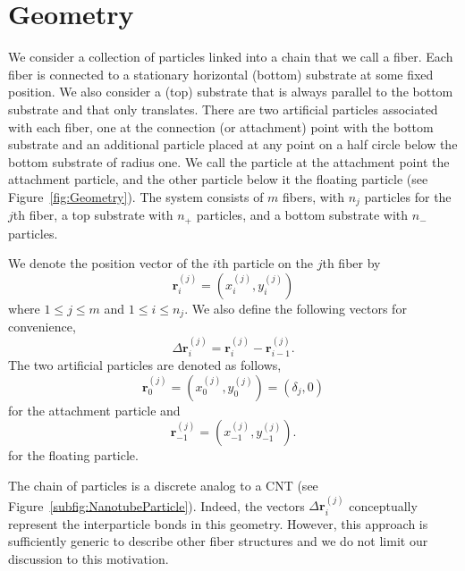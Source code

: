 \section{Geometry}

   We consider a collection of particles linked into a chain that we call a fiber. Each fiber is connected to a stationary horizontal (bottom) substrate at some fixed position. We also consider a (top) substrate that is always parallel to the bottom substrate and that only translates. There are two artificial particles associated with each fiber, one at the connection (or attachment) point with the bottom substrate and an additional particle placed at any point on a half circle below the bottom substrate of radius one. We call the particle at the attachment point the attachment particle, and the other particle below it the floating particle (see Figure~\ref{fig:Geometry}). The system consists of $m$ fibers, with $n_j$ particles for the $j$th fiber, a top substrate with $n_+$ particles, and a bottom substrate with $n_-$ particles.
	
We denote the position vector of the $i$th particle on the $j$th fiber by
\begin{equation}
	\textbf{r}_i^{(j)} = (x_i^{(j)},y_i^{(j)})
\end{equation}
where $1 \leq j \leq m$ and $1 \leq i \leq n_j$. We also define the following vectors for convenience,
\begin{equation}
	\Delta \textbf{r}_i^{(j)} = \textbf{r}_i^{(j)} - \textbf{r}_{i-1}^{(j)}.
\end{equation}
The two artificial particles are denoted as follows,
\begin{equation}
	\textbf{r}_0^{(j)} = (x_0^{(j)},y_0^{(j)}) = (\delta_j,0)
\end{equation}
for the attachment particle and
\begin{equation}
	\textbf{r}_{-1}^{(j)} = (x_{-1}^{(j)},y_{-1}^{(j)}).
\end{equation}
for the floating particle.

	The chain of particles is a discrete analog to a CNT (see Figure~\ref{subfig:NanotubeParticle}). Indeed, the vectors $\Delta \textbf{r}_i^{(j)}$ conceptually represent the interparticle bonds in this geometry. However, this approach is sufficiently generic to describe other fiber structures and we do not limit our discussion to this motivation.
	

